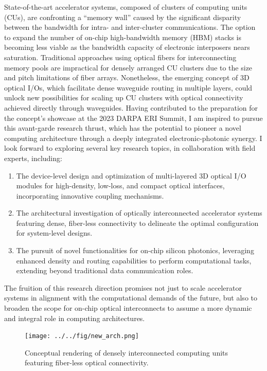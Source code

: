 State-of-the-art accelerator systems, composed of clusters of computing units (CUs), are confronting a ``memory wall'' caused by the significant disparity between the bandwidth for intra- and inter-cluster communications. The option to expand the number of on-chip high-bandwidth memory (HBM) stacks is becoming less viable as the bandwidth capacity of electronic interposers nears saturation. Traditional approaches using optical fibers for interconnecting memory pools are impractical for densely arranged CU clusters due to the size and pitch limitations of fiber arrays. Nonetheless, the emerging concept of 3D optical I/Os, which facilitate dense waveguide routing in multiple layers, could unlock new possibilities for scaling up CU clusters with optical connectivity achieved directly through waveguides. Having contributed to the preparation for the concept's showcase at the 2023 DARPA ERI Summit, I am inspired to pursue this avant-garde research thrust, which has the potential to pioneer a novel computing architecture through a deeply integrated electronic-photonic synergy. I look forward to exploring several key research topics, in collaboration with field experts, including:
\begin{enumerate}[nosep]
    \item The device-level design and optimization of multi-layered 3D optical I/O modules for high-density, low-loss, and compact optical interfaces, incorporating innovative coupling mechanisms.
    \item The architectural investigation of optically interconnected accelerator systems featuring dense, fiber-less connectivity to delineate the optimal configuration for system-level designs.
    \item The pursuit of novel functionalities for on-chip silicon photonics, leveraging enhanced density and routing capabilities to perform computational tasks, extending beyond traditional data communication roles.
\end{enumerate}
The fruition of this research direction promises not just to scale accelerator systems in alignment with the computational demands of the future, but also to broaden the scope for on-chip optical interconnects to assume a more dynamic and integral role in computing architectures.

\begin{figure}[!ht]%
    \texttt{[image: ../../fig/new\_arch.png]}
    \caption{Conceptual rendering of densely interconnected computing units featuring fiber-less optical connectivity.}
    \label{fig:new_arch}
\end{figure}

